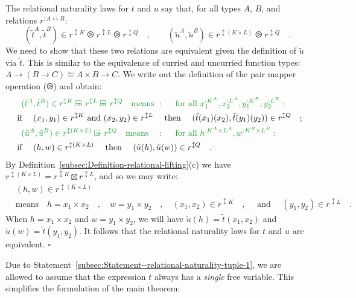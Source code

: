 The relational naturality laws for $t$ and $u$ say that, for all
types $A$, $B$, and relations $r^{:A\leftrightarrow B}$:
\[
(\tilde{t}^{A},\tilde{t}^{B})\in r^{\updownarrow K}\ogreaterthan r^{\updownarrow L}\ogreaterthan r^{\updownarrow Q}\quad,\quad\quad(\tilde{u}^{A},\tilde{u}^{B})\in r^{\updownarrow(K\times L)}\ogreaterthan r^{\updownarrow Q}\quad.
\]
We need to show that these two relations are equivalent given the
definition of $\tilde{u}$ via $\tilde{t}$. This is similar to the
equivalence of curried and uncurried function types: $A\rightarrow(B\rightarrow C)\cong A\times B\rightarrow C$.
We write out the definition of the pair mapper operation ($\ogreaterthan$)
and obtain:
\begin{align*}
 & \quad{\color{greenunder}(\tilde{t}^{A},\tilde{t}^{B})\in r^{\updownarrow K}\ogreaterthan r^{\updownarrow L}\ogreaterthan r^{\updownarrow Q}\quad\text{means }:\quad\text{ for all }x_{1}^{:K^{A}},x_{2}^{:L^{A}},y_{1}^{:K^{B}},y_{2}^{:L^{B}}:}\quad\\
 & \,\text{ if }\quad(x_{1},y_{1})\in r^{\updownarrow K}\text{ and }(x_{2},y_{2})\in r^{\updownarrow L}\quad\text{ then }\quad(\tilde{t}(x_{1})(x_{2}),\tilde{t}(y_{1})(y_{2}))\in r^{\updownarrow Q}\quad;\\
 & \quad{\color{greenunder}(\tilde{u}^{A},\tilde{u}^{B})\in r^{\updownarrow(K\times L)}\ogreaterthan r^{\updownarrow Q}\quad\text{means}\quad:\quad\text{ for all }h^{:K^{A}\times L^{A}},w^{:K^{B}\times L^{B}}:}\quad\\
 & \,\text{ if }\quad(h,w)\in r^{\updownarrow(K\times L)}\quad\text{ then }\quad(\tilde{u}(h),\tilde{u}(w))\in r^{\updownarrow Q}\quad.
\end{align*}
By Definition~\ref{subsec:Definition-relational-lifting}(c) we have
$r^{\updownarrow(K\times L)}=r^{\updownarrow K}\boxtimes r^{\updownarrow L}$,
and so we may write: 
\begin{align*}
 & (h,w)\in r^{\updownarrow(K\times L)}\\
 & \text{means}\quad h=x_{1}\times x_{2}\quad,\quad w=y_{1}\times y_{2}\quad,\quad(x_{1},x_{2})\in r^{\updownarrow K}\quad,\quad\text{ and }\quad(y_{1},y_{2})\in r^{\updownarrow L}\quad.
\end{align*}
When $h=x_{1}\times x_{2}$ and $w=y_{1}\times y_{2}$, we will have
$\tilde{u}(h)=\tilde{t}(x_{1},x_{2})$ and $\tilde{u}(w)=\tilde{t}(y_{1},y_{2})$.
It follows that the relational naturality laws for $t$ and $u$ are
equivalent. $\square$

Due to Statement~\ref{subsec:Statement--relational-naturality-tuple-1},
we are allowed to assume that the expression $t$ always has a \emph{single}
free variable. This simplifies the formulation of the main theorem:

